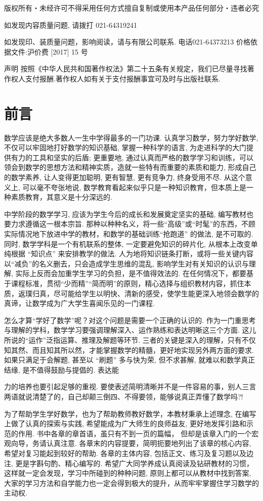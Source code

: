 \documentclass[10pt]{article}
\begin{document}
版权所有・未经许可不得采用任何方式擅自复制或使用本产品任何部分・违者必究

如发现内容质量问题, 请拨打 021-64319241

如发现印、装质量问题，影响阅读，请与有限公司联系. 电话021-64373213 价格依据文件:沪价费 [2017] 15 号

声明 按照《中华人民共和国著作权法》第二十五条有关规定，我们已尽量寻找著作权人支付报酬.著作权人如有关于支付报酬事宜可及时与出版社联系.

\section*{前言}

数学应该是绝大多数人一生中学得最多的一门功课. 认真学习数学，努力学好数学, 不仅可以牢固地打好数学的知识基础, 掌握一种科学的语言, 为走进科学的大门提供有力的工具和坚实的后盾; 更重要地, 通过认真而严格的数学学习和训练，可以领会到数学的思想方法和精神实质，造就一些特有而重要的素质和能力, 形成自己的数学素养, 让人变得更加聪明, 更有智慧, 更有竞争力, 终身受用不尽. 从这个意义上, 可以毫不夸张地说, 数学教育看起来似乎只是一种知识教育，但本质上是一种素质教育，其意义是十分深远的.

中学阶段的数学学习, 应该为学生今后的成长和发展奠定坚实的基础, 编写教材也要力求遵循这一根本宗旨. 那种以种种名义，将一些“高级”或“时髦”的东西，不顾实际情况地下放进中学的教材，和数学的基础训练“抢跑道” 的做法, 是不可取的. 同时, 数学学科是一个有机联系的整体, 一定要避免知识的碎片化, 从根本上改变单纯根据 “知识点” 来安排教学的做法. 人为地将知识链条打断，或将一些关键内容以“减负”的名义删去，只会造成学生思维的混乱, 影响学生对有关知识的认识与理解, 实际上反而会加重学生学习的负担，是不值得效法的. 在任何情况下，都要基于课程标准，贯彻“少而精”“简而明”的原则，精心选择与组织教材内容，抓住本质，返璞归真，尽可能给学生以明快、清新的感受，使学生能更深入地领会数学的真谛，让数学成为广大学生喜闻乐见的一门课程.

怎么才算“学好了数学”呢？对这个问题是需要一个正确的认识的. 作为一门重思考与理解的学科，数学学习要强调理解深入、运作熟练和表达明晰这三个方面. 这儿所说的“运作”泛指运算、推理及解题等环节. 三者的关键是深入的理解，只有不仅知其然、而且知其所以然，才能掌握数学的精髓，更好地实现另外两方面的要求. 如果只满足于会解题, 甚至以 “刷题” 多与快为荣, 但不求甚解, 就难以和数学真正结缘, 是不值得鼓励与提倡的. 表达能

力的培养也要引起足够的重视. 要使表述简明清晰并不是一件容易的事，别人三言两语就说清楚了的，自己却颠三倒四、不得要领，能够说真正弄懂了数学吗?!

为了帮助学生学好数学，也为了帮助教师教好数学，本教材秉承上述理念, 在编写上做了认真的探索与实践, 希望能成为广大师生的良师益友, 更好地发挥引路和示范的作用. 书中各章的章首语，虽只有不到一页的篇幅， 但却是该章入门的一个宏观向导，务请认真注意. 各章末的内容提要，简明扼要地列出了该章的核心内容, 希望对复习能起到较好的帮助. 各章的主体内容, 包括正文、练习及复习题以及边注, 更是字斟句酌、精心编写的. 希望广大同学养成认真阅读及钻研教材的习惯，这样就一定会发现，学习中所碰到的种种问题, 原则上都可以从教材中找到答案, 大家的学习方法和自学能力也一定会得到极大的提升，从而牢牢掌握住学习数学的主动权.
\end{document}
